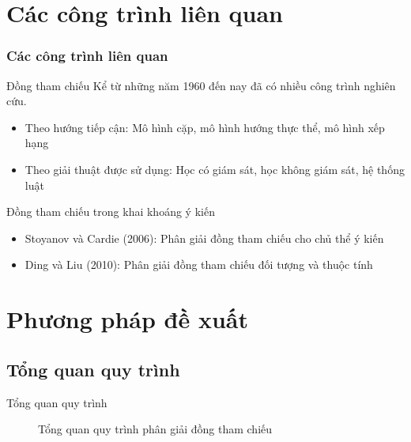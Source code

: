 \documentclass[9pt,xcolor=table,hyperref=unicode]{beamer}
\begin{document}
	\section{Các công trình liên quan}
	\begin{frame}
		\frametitle{Các công trình liên quan}
		\begin{block}{Đồng tham chiếu}
			Kể từ những năm 1960 đến nay đã có nhiều công trình nghiên cứu.
			\begin{itemize}
				\item{Theo hướng tiếp cận: Mô hình cặp, mô hình hướng thực thể, mô hình xếp hạng}
				\item{Theo giải thuật được sử dụng: Học có giám sát, học không giám sát, hệ thống luật}
			\end{itemize}
		\end{block}
		\begin{block}{Đồng tham chiếu trong khai khoáng ý kiến}
			\begin{itemize}
				\item{Stoyanov và Cardie (2006): Phân giải đồng tham chiếu cho chủ thể ý kiến \footnotemark}
				\item{Ding và Liu (2010): Phân giải đồng tham chiếu đối tượng và thuộc tính \footnotemark}
			\end{itemize}
		\end{block}
	\end{frame}

	\section{Phương pháp đề xuất}
	\subsection{Tổng quan quy trình}
	\begin{frame}{Tổng quan quy trình}		
		\begin{figure}[H]
			\LARGE 
			\centering				
			\resizebox{100mm}{!}{}
			\caption{Tổng quan quy trình phân giải đồng tham chiếu}									
		\end{figure}
	\end{frame}	
\end{document}
